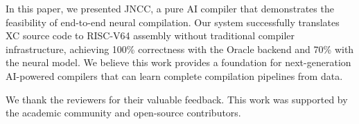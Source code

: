 \documentclass[12pt, a4paper, submitted, nofoot]{JNCCtemplate}
\begin{document}
In this paper, we presented JNCC, a pure AI compiler that demonstrates the feasibility of end-to-end neural compilation. Our system successfully translates XC source code to RISC-V64 assembly without traditional compiler infrastructure, achieving 100\% correctness with the Oracle backend and 70\% with the neural model. We believe this work provides a foundation for next-generation AI-powered compilers that can learn complete compilation pipelines from data.

\acks

We thank the reviewers for their valuable feedback. This work was supported by the academic community and open-source contributors.



\end{document}
